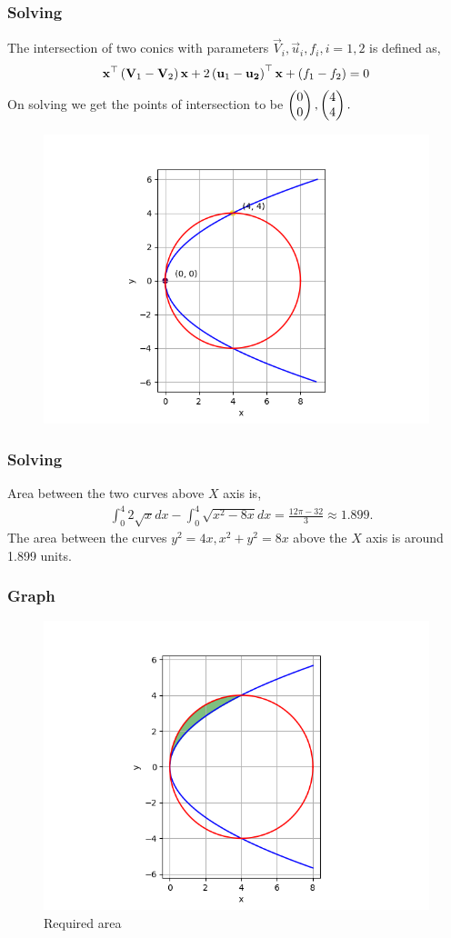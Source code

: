 \documentclass{beamer}
\begin{document}
\begin{frame}
	\frametitle{Solving}
The intersection of two conics with parameters $\vec{V}_i,\vec{u}_i,f_i, i=1,2$ is defined as,
\begin{align}
	\mathbf{x}^{\top}\left(\mathbf{V}_1-\mathbf{V}_2\right)\mathbf{x}+2\left(\mathbf{u}_1-\mathbf{u_2}\right)^{\top}\mathbf{x}+\left(f_1-f_2\right)=0
\end{align} 
On solving we get the points of intersection to be $\begin{pmatrix}0\\0\end{pmatrix},\begin{pmatrix}4\\4\end{pmatrix}.$
\begin{figure}[h!]
   \centering
   \includegraphics[width = 0.5\linewidth]{figs/fig1.png}
   \label{stemplot}
\end{figure}
\end{frame}

\begin{frame}
	\frametitle{Solving}
Area between the two curves above $X$ axis is,
\begin{align}
	&\int_0^4 2\sqrt{x} dx- \int_0^4 \sqrt{x^2-8x} dx = \frac{12\pi-32}{3} \approx 1.899.
\end{align}
The area between the curves $y^2=4x, x^2+y^2=8x$ above the $X$ axis is around 1.899 units.
\end{frame}
\begin{frame}
	\frametitle{Graph}
\begin{figure}[h!]
   \centering
   \includegraphics[width = 0.7\linewidth]{figs/fig.png}
   \caption{Required area}
   \label{stemplot}
\end{figure}
\end{frame}
\end{document}

